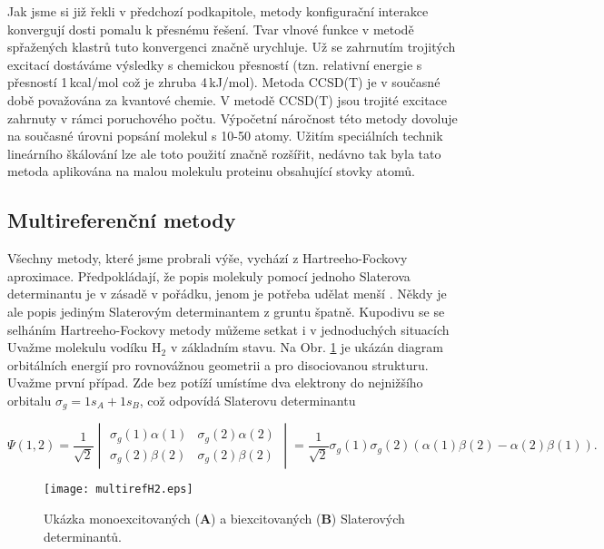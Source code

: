 Jak jsme si již řekli v předchozí podkapitole, metody konfigurační interakce konvergují dosti pomalu k přesnému řešení. Tvar vlnové funkce v metodě spřažených klastrů tuto konvergenci značně urychluje. Už se zahrnutím trojitých excitací dostáváme výsledky s chemickou přesností (tzn. relativní energie s přesností 1\,kcal/mol což je zhruba 4\,kJ/mol).
Metoda CCSD(T) je v současné době považována za  kvantové chemie. V metodě CCSD(T) jsou trojité excitace zahrnuty v rámci poruchového počtu. Výpočetní náročnost této metody dovoluje na současné úrovni popsání molekul s 10-50
atomy. Užitím speciálních technik lineárního škálování lze ale toto použití značně rozšířit, nedávno tak byla tato metoda aplikována na malou molekulu proteinu obsahující stovky atomů. 

\subsection{Multireferenční metody}

Všechny metody, které jsme probrali výše, vychází z Hartreeho-Fockovy aproximace. Předpokládají, že popis molekuly pomocí jednoho Slaterova determinantu je v zásadě v pořádku, jenom je potřeba udělat menší . Někdy je ale popis jediným Slaterovým determinantem z gruntu špatně. Kupodivu se se selháním Hartreeho-Fockovy metody můžeme setkat i v jednoduchých situacích Uvažme molekulu vodíku H$_2$ v základním stavu. Na Obr. \ref{obr:abinitio:multirefH2} je ukázán diagram orbitálních energií pro rovnovážnou geometrii a pro disociovanou strukturu. Uvažme první případ. Zde bez potíží umístíme dva elektrony do nejnižšího orbitalu $\sigma_g=1s_A+1s_B$, což odpovídá Slaterovu determinantu

\begin{equation}
\Psi (1,2)=\frac{1}{\sqrt{2}}
\begin{vmatrix}
\sigma_g(1)\alpha (1) & \sigma_g(2)\alpha (2) \\
\sigma_g(2)\beta (2) & \sigma_g(2)\beta (2)
\end{vmatrix}
=\frac{1}{\sqrt{2}}\sigma_g(1)\sigma_g(2)(\alpha (1)\beta (2)-\alpha (2)\beta (1)) .
\label{rov:abinitio:SDH2}
\end{equation}

\begin{figure}
\centering
\texttt{[image: multirefH2.eps]}
\caption[Disociace molekuly vodíku]{Ukázka monoexcitovaných (\textbf{A}) a biexcitovaných (\textbf{B}) Slaterových determinantů.}
\label{obr:abinitio:multirefH2}
\end{figure}

